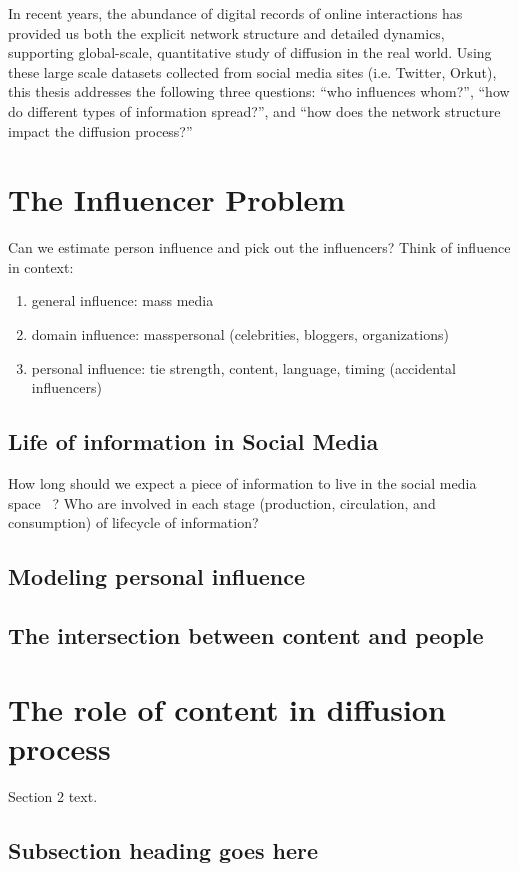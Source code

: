\documentclass[phd,tocprelim]{cornell}
\begin{document}
In recent years, the abundance of digital records of online interactions has provided us both the explicit network structure and detailed dynamics, supporting global-scale, quantitative study of diffusion in the real world. Using these large scale datasets collected from social media sites (i.e. Twitter, Orkut), this thesis addresses the following three questions: ``who influences whom?'', ``how do different types of information spread?'',  and ``how does the network structure impact the diffusion process?''

\section{The Influencer Problem}
Can we estimate person influence and pick out the influencers?
Think of influence in context:
\begin{enumerate}
\item general influence: mass media
\item domain influence: masspersonal (celebrities, bloggers, organizations)
\item personal influence: tie strength, content, language, timing (accidental influencers)
\end{enumerate}

\subsection{Life of information in Social Media}
How long should we expect a piece of information to live in the social media space ~\cite{Leskovec-Newscycle-2009}? Who are involved in each stage (production, circulation, and consumption) of lifecycle of information? 


\subsection{Modeling personal influence}

\subsection{The intersection between content and people}

\section{The role of content in diffusion process}
Section 2 text.

\subsection{Subsection heading goes here}
\end{document}
